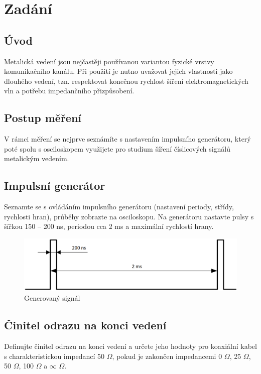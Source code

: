 
\section{Zadání}
\subsection{Úvod}
Metalická vedení jsou nejčastěji používanou variantou fyzické vrstvy komunikačního kanálu. Při použití je nutno
uvažovat jejich vlastnosti jako dlouhého vedení, tzn. respektovat konečnou rychlost šíření elektromagnetických
vln a potřebu impedančního přizpůsobení.
\subsection{Postup měření}
V rámci měření se nejprve seznámíte s nastavením impulsního generátoru, který poté spolu s osciloskopem
využijete pro studium šíření číslicových signálů metalickým vedením.
\subsection{Impulsní generátor}
Seznamte se s ovládáním impulsního generátoru (nastavení periody, střídy, rychlosti hran), průběhy zobrazte
na osciloskopu. Na generátoru nastavte pulsy s šířkou 150 – 200 ns, periodou cca 2 ms a maximální rychlostí
hrany.
\begin{figure}[h]
\centering
\includegraphics[width=12cm]{images/01-zadani.png}
\caption{Generovaný signál}
\label{fig:1}
\end{figure}
\subsection{Činitel odrazu na konci vedení}
Definujte činitel odrazu na konci vedení a určete jeho hodnoty pro koaxiální kabel s charakteristickou
impedancí 50 $\Omega$, pokud je zakončen impedancemi 0 $\Omega$, 25 $\Omega$, 50 $\Omega$, 100 $\Omega$ a $\infty$ $\Omega$.
\newpage
